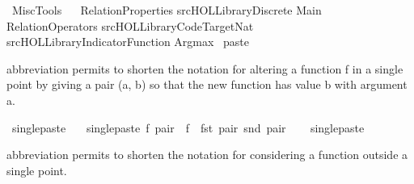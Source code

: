 %
\begin{isabellebody}%
\def\isabellecontext{MiscTools}%
%
\isamarkuptrue%
%
\isadelimtheory
%
\endisadelimtheory
%
\isatagtheory
{}\isamarkupfalse%
\ MiscTools\ \isanewline
\isanewline
{}\ \isanewline
RelationProperties\isanewline
{\isachardoublequoteopen}{\isachartilde}{\isachartilde}{\isacharslash}src{\isacharslash}HOL{\isacharslash}Library{\isacharslash}Discrete{\isachardoublequoteclose}\isanewline
Main\isanewline
RelationOperators\isanewline
{\isachardoublequoteopen}{\isachartilde}{\isachartilde}{\isacharslash}src{\isacharslash}HOL{\isacharslash}Library{\isacharslash}Code{\isacharunderscore}Target{\isacharunderscore}Nat{\isachardoublequoteclose}\isanewline
{\isachardoublequoteopen}{\isachartilde}{\isachartilde}{\isacharslash}src{\isacharslash}HOL{\isacharslash}Library{\isacharslash}Indicator{\isacharunderscore}Function{\isachardoublequoteclose}\isanewline
Argmax\isanewline
\isanewline
{}%
\endisatagtheory
{\isafoldtheory}%
%
\isadelimtheory
%
\endisadelimtheory
%
\isamarkuptrue%
\isamarkupfalse%
\ paste\ {\isacharparenleft}\ {\isachardoublequoteopen}{\isacharplus}{\isacharless}{\isachardoublequoteclose}\ {}{}{\isacharparenright}%
\begin{isamarkuptext}%
\isa{{\isacharplus}{\isacharless}} abbreviation permits to shorten the notation for altering a function f in a single point by giving a pair (a, b) so that the new function has value b with argument a.%
\end{isamarkuptext}%
\isamarkuptrue%
\isamarkupfalse%
\ singlepaste\isanewline
\ \ \ {\isachardoublequoteopen}singlepaste\ f\ pair\ {\isacharequal}{\isacharequal}\ f\ {\isacharplus}{\isacharasterisk}\ {\isacharbraceleft}{\isacharparenleft}fst\ pair{\isacharcomma}\ snd\ pair{\isacharparenright}{\isacharbraceright}{\isachardoublequoteclose}\isanewline
\ \ \isamarkupfalse%
\ singlepaste\ {\isacharparenleft}\ {\isachardoublequoteopen}{\isacharplus}{\isacharless}{\isachardoublequoteclose}\ {}{}{\isacharparenright}%
\begin{isamarkuptext}%
\isa{{\isacharminus}{\isacharminus}} abbreviation permits to shorten the notation for considering a function outside a single point.%

\end{isamarkuptext}
\end{isabellebody}
